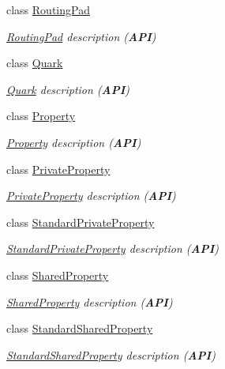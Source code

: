 \begin{DoxyCompactItemize}
class \hyperlink{classHurricane_1_1RoutingPad}{Routing\-Pad}
\begin{DoxyCompactList}\small\item\em \hyperlink{classHurricane_1_1RoutingPad}{Routing\-Pad} description ({\bfseries A\-P\-I}) \end{DoxyCompactList}\item 
class \hyperlink{classHurricane_1_1Quark}{Quark}
\begin{DoxyCompactList}\small\item\em \hyperlink{classHurricane_1_1Quark}{Quark} description ({\bfseries A\-P\-I}) \end{DoxyCompactList}\item 
class \hyperlink{classHurricane_1_1Property}{Property}
\begin{DoxyCompactList}\small\item\em \hyperlink{classHurricane_1_1Property}{Property} description ({\bfseries A\-P\-I}) \end{DoxyCompactList}\item 
class \hyperlink{classHurricane_1_1PrivateProperty}{Private\-Property}
\begin{DoxyCompactList}\small\item\em \hyperlink{classHurricane_1_1PrivateProperty}{Private\-Property} description ({\bfseries A\-P\-I}) \end{DoxyCompactList}\item 
class \hyperlink{classHurricane_1_1StandardPrivateProperty}{Standard\-Private\-Property}
\begin{DoxyCompactList}\small\item\em \hyperlink{classHurricane_1_1StandardPrivateProperty}{Standard\-Private\-Property} description ({\bfseries A\-P\-I}) \end{DoxyCompactList}\item 
class \hyperlink{classHurricane_1_1SharedProperty}{Shared\-Property}
\begin{DoxyCompactList}\small\item\em \hyperlink{classHurricane_1_1SharedProperty}{Shared\-Property} description ({\bfseries A\-P\-I}) \end{DoxyCompactList}\item 
class \hyperlink{classHurricane_1_1StandardSharedProperty}{Standard\-Shared\-Property}
\begin{DoxyCompactList}\small\item\em \hyperlink{classHurricane_1_1StandardSharedProperty}{Standard\-Shared\-Property} description ({\bfseries A\-P\-I}) \end{DoxyCompactList}\item 

\end{DoxyCompactItemize}
